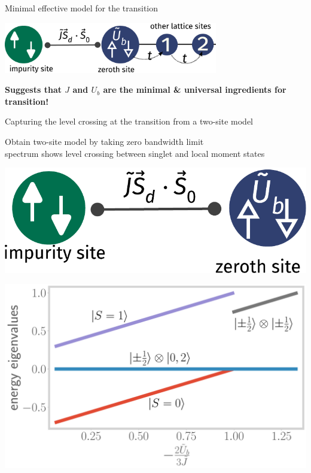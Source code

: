 \documentclass[9pt,aspectratio=169]{beamer}
\begin{document}
\begin{frame}{Minimal effective model for the transition}
{\includegraphics[width=0.7\textwidth]{universal-theory.pdf}

\vspace*{\fill}

\textbf{Suggests that \alert{$J$ and $U_b$ are the minimal \& universal ingredients} for transition!}
}

\end{frame}

\begin{frame}{Capturing the level crossing at the transition from a two-site model}

\begin{itemize}
	\nitem Obtain two-site model by taking \alert{zero bandwidth} limit\\[10pt]
	\nitem spectrum shows \alert{level crossing} between singlet and local moment states
\end{itemize}

\vspace*{\fill}

\begin{minipage}{0.4\textwidth}
\includegraphics[width=\textwidth]{two-site.pdf}
\end{minipage}
\hspace*{\fill}
\begin{minipage}{0.5\textwidth}
\includegraphics[width=\textwidth]{twosite_spectrum.pdf}
\end{minipage}
\end{frame}
\end{document}
